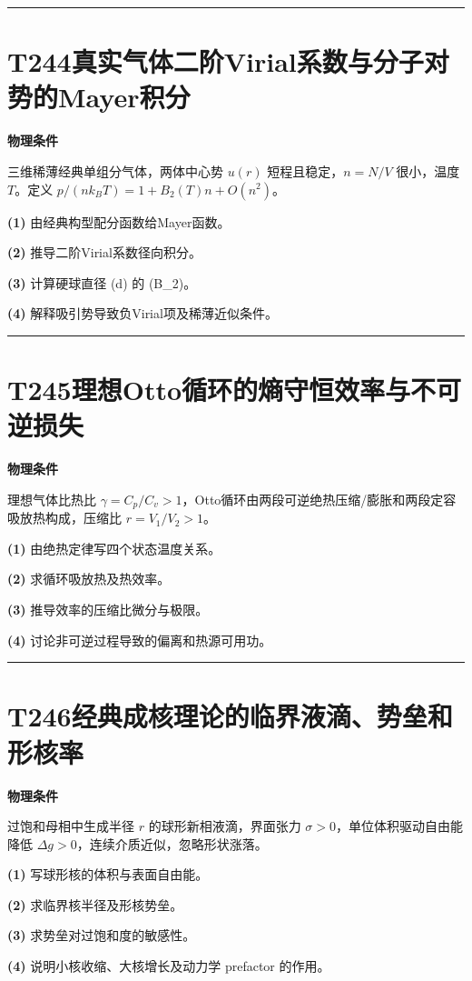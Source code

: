 \documentclass[UTF8,a4paper,11pt,oneside,openany]{ctexbook}
\begin{document}
\par\bigskip\hrule\bigskip
\section*{T244\quad 真实气体二阶Virial系数与分子对势的Mayer积分}
\textbf{物理条件}\par 三维稀薄经典单组分气体，两体中心势 \(u(r)\) 短程且稳定，\(n=N/V\) 很小，温度 \(T\)。定义 \(p/(nk_BT)=1+B_2(T)n+O(n^2)\)。
\par\noindent\textbf{(1)} 由经典构型配分函数给Mayer函数。
\par\noindent\textbf{(2)} 推导二阶Virial系数径向积分。
\par\noindent\textbf{(3)} 计算硬球直径 (d) 的 (B\_2)。
\par\noindent\textbf{(4)} 解释吸引势导致负Virial项及稀薄近似条件。

\par\bigskip\hrule\bigskip
\section*{T245\quad 理想Otto循环的熵守恒效率与不可逆损失}
\textbf{物理条件}\par 理想气体比热比 \(\gamma=C_p/C_v>1\)，Otto循环由两段可逆绝热压缩/膨胀和两段定容吸放热构成，压缩比 \(r=V_1/V_2>1\)。
\par\noindent\textbf{(1)} 由绝热定律写四个状态温度关系。
\par\noindent\textbf{(2)} 求循环吸放热及热效率。
\par\noindent\textbf{(3)} 推导效率的压缩比微分与极限。
\par\noindent\textbf{(4)} 讨论非可逆过程导致的偏离和热源可用功。

\par\bigskip\hrule\bigskip
\section*{T246\quad 经典成核理论的临界液滴、势垒和形核率}
\textbf{物理条件}\par 过饱和母相中生成半径 \(r\) 的球形新相液滴，界面张力 \(\sigma>0\)，单位体积驱动自由能降低 \(\Delta g>0\)，连续介质近似，忽略形状涨落。
\par\noindent\textbf{(1)} 写球形核的体积与表面自由能。
\par\noindent\textbf{(2)} 求临界核半径及形核势垒。
\par\noindent\textbf{(3)} 求势垒对过饱和度的敏感性。
\par\noindent\textbf{(4)} 说明小核收缩、大核增长及动力学 prefactor 的作用。
\end{document}
